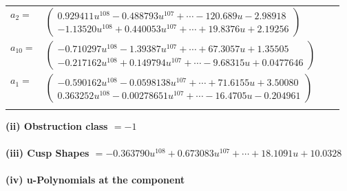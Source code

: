\documentclass[1p]{elsarticle_modified}
\theoremstyle{definition}
\begin{document}
\begin{tabular}{m{7pt} m{180pt} m{7pt} m{180pt} }
\flushright $a_{2}=$&$\begin{pmatrix}0.929411 u^{108}-0.488793 u^{107}+\cdots-120.689 u-2.98918\\-1.13520 u^{108}+0.440053 u^{107}+\cdots+19.8376 u+2.19256\end{pmatrix}$ \\
\flushright $a_{10}=$&$\begin{pmatrix}-0.710297 u^{108}-1.39387 u^{107}+\cdots+67.3057 u+1.35505\\-0.217162 u^{108}+0.149794 u^{107}+\cdots-9.68315 u+0.0477646\end{pmatrix}$ \\
\flushright $a_{1}=$&$\begin{pmatrix}-0.590162 u^{108}-0.0598138 u^{107}+\cdots+71.6155 u+3.50080\\0.363252 u^{108}-0.00278651 u^{107}+\cdots-16.4705 u-0.204961\end{pmatrix}$\\&\end{tabular}
\flushleft \textbf{(ii) Obstruction class $= -1$}\\~\\
\flushleft \textbf{(iii) Cusp Shapes $= -0.363790 u^{108}+0.673083 u^{107}+\cdots+18.1091 u+10.0328$}\\~\\
\newpage\renewcommand{\arraystretch}{1}
\flushleft \textbf{(iv) u-Polynomials at the component}\newline \\
\end{document}
